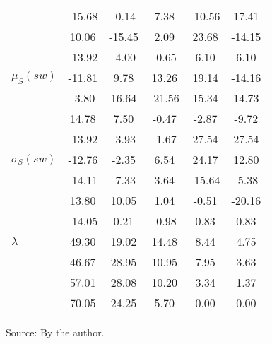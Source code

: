 \begin{table}[h!]
\begin{center}
\begin{tabular}{| l || c | c | c | c | c |}
 & -15.68  & -0.14  & 7.38  & -10.56  & 17.41 \\
 & 10.06  & -15.45  & 2.09  & 23.68  & -14.15 \\
 & -13.92  & -4.00  & -0.65  & 6.10  & 6.10 \\\hline
$\mu_S(sw)$ & -11.81  & 9.78  & 13.26  & 19.14  & -14.16 \\
 & -3.80  & 16.64  & -21.56  & 15.34  & 14.73 \\
 & 14.78  & 7.50  & -0.47  & -2.87  & -9.72 \\
 & -13.92  & -3.93  & -1.67  & 27.54  & 27.54 \\\hline
$\sigma_S(sw)$ & -12.76  & -2.35  & 6.54  & 24.17  & 12.80 \\
 & -14.11  & -7.33  & 3.64  & -15.64  & -5.38 \\
 & 13.80  & 10.05  & 1.04  & -0.51  & -20.16 \\
 & -14.05  & 0.21  & -0.98  & 0.83  & 0.83 \\\hline\hline
$\lambda$ & 49.30  & 19.02  & 14.48  & 8.44  & 4.75 \\
 & 46.67  & 28.95  & 10.95  & 7.95  & 3.63 \\
 & 57.01  & 28.08  & 10.20  & 3.34  & 1.37 \\
 & 70.05  & 24.25  & 5.70  & 0.00  & 0.00 \\\hline
\end{tabular}
\begin{flushleft}\footnotesize
		Source: By the author.\
\end{flushleft}
\end{center}
\end{table}
